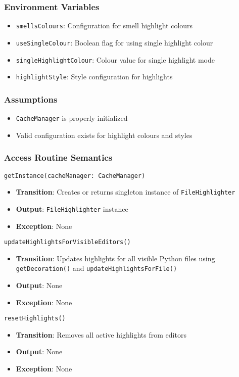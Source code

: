 \documentclass[12pt, titlepage]{article}
\begin{document}
\subsubsection{Environment Variables}
\begin{itemize}
\item \texttt{smellsColours}: Configuration for smell highlight colours
\item \texttt{useSingleColour}: Boolean flag for using single highlight colour
\item \texttt{singleHighlightColour}: Colour value for single highlight mode
\item \texttt{highlightStyle}: Style configuration for highlights
\end{itemize}

\subsubsection{Assumptions}
\begin{itemize}
\item \texttt{CacheManager} is properly initialized
\item Valid configuration exists for highlight colours and styles
\end{itemize}

\subsubsection{Access Routine Semantics}
\texttt{getInstance(cacheManager: CacheManager)}
\begin{itemize}
\item \textbf{Transition}: Creates or returns singleton instance of \texttt{FileHighlighter}
\item \textbf{Output}: \texttt{FileHighlighter} instance
\item \textbf{Exception}: None
\end{itemize}

\texttt{updateHighlightsForVisibleEditors()}
\begin{itemize}
\item \textbf{Transition}: Updates highlights for all visible Python files using \texttt{getDecoration()} and \texttt{updateHighlightsForFile()}
\item \textbf{Output}: None
\item \textbf{Exception}: None
\end{itemize}

\texttt{resetHighlights()}
\begin{itemize}
\item \textbf{Transition}: Removes all active highlights from editors
\item \textbf{Output}: None
\item \textbf{Exception}: None
\end{itemize}
\end{document}
